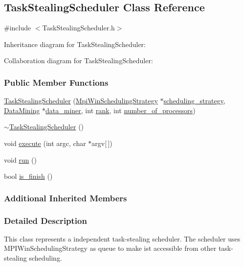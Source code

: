 \hypertarget{a00089}{}\subsection{Task\+Stealing\+Scheduler Class Reference}
\label{a00089}


{\ttfamily \#include $<$Task\+Stealing\+Scheduler.\+h$>$}



Inheritance diagram for Task\+Stealing\+Scheduler\+:


Collaboration diagram for Task\+Stealing\+Scheduler\+:
\subsubsection*{Public Member Functions}
\begin{DoxyCompactItemize}
\item 
\hyperlink{a00089_af893fa98efeda805d0632c77b8a7ea8e}{Task\+Stealing\+Scheduler} (\hyperlink{a00058}{Mpi\+Win\+Scheduling\+Strategy} $\ast$\hyperlink{a00005_a7dd11eee79bfb44c820d6c28480fd0c7}{scheduling\+\_\+strategy}, \hyperlink{a00021}{Data\+Mining} $\ast$\hyperlink{a00005_a6e281d90fa4b965779cd13eabf7d0249}{data\+\_\+miner}, int \hyperlink{a00027_a33c24e2887b4d9c4ef7f3566d3bc803e}{rank}, int \hyperlink{a00027_a4e798bde66d26fe200de7e8d2b54e915}{number\+\_\+of\+\_\+processors})
\item 
\hyperlink{a00089_a4ac70e3f8599b547ba886ff895e70d12}{$\sim$\+Task\+Stealing\+Scheduler} ()
\item 
void \hyperlink{a00089_a8e2a2515ccc6021980508ba085f104fa}{execute} (int argc, char $\ast$argv\mbox{[}$\,$\mbox{]})
\item 
void \hyperlink{a00089_a362edbac4a417c08ee8b19a364cc97bb}{run} ()
\item 
bool \hyperlink{a00089_a4d411046663ce0d63f4f70505aa51a2d}{is\+\_\+finish} ()
\end{DoxyCompactItemize}
\subsubsection*{Additional Inherited Members}


\subsubsection{Detailed Description}
This class represents a independent task-\/stealing scheduler. The scheduler uses M\+P\+I\+Win\+Scheduling\+Strategy as queue to make ist accessible from other task-\/stealing scheduling.

